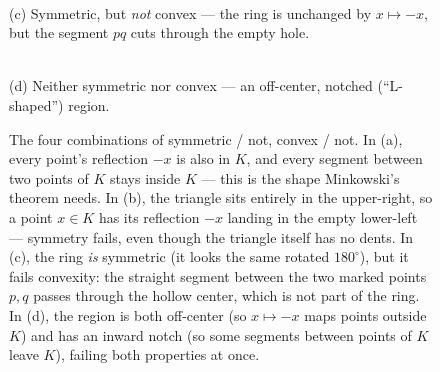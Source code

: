 \begin{figure}[h]
\begin{minipage}[t]{0.47\textwidth}
\centering
{}\\[2pt]
{\small (c) Symmetric, but \emph{not} convex --- the ring is unchanged by $x\mapsto -x$, but the segment $pq$ cuts through the empty hole.}
\end{minipage}%
\hfill
\begin{minipage}[t]{0.47\textwidth}
\centering
{}\\[2pt]
{\small (d) Neither symmetric nor convex --- an off-center, notched (``L-shaped'') region.}
\end{minipage}
\caption{The four combinations of symmetric / not, convex / not. In (a), every point's reflection $-x$ is also in $K$, and every segment between two points of $K$ stays inside $K$ --- this is the shape Minkowski's theorem needs. In (b), the triangle sits entirely in the upper-right, so a point $x\in K$ has its reflection $-x$ landing in the empty lower-left --- symmetry fails, even though the triangle itself has no dents. In (c), the ring \emph{is} symmetric (it looks the same rotated $180^\circ$), but it fails convexity: the straight segment between the two marked points $p,q$ passes through the hollow center, which is not part of the ring. In (d), the region is both off-center (so $x\mapsto -x$ maps points outside $K$) and has an inward notch (so some segments between points of $K$ leave $K$), failing both properties at once.}
\label{fig:sym-convex-examples}
\end{figure}

